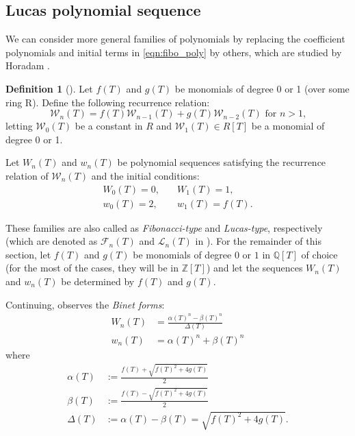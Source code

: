 \documentclass[letterpaper, 10pt]{article}
\newcommand{\bQ}{\mathbb{Q}}
\newcommand{\bZ}{\mathbb{Z}}
\newcommand{\1}{\mathds{1}}	%
\theoremstyle{definition}
\newtheorem{definition}[theorem]{Definition}
\theoremstyle{remark}
\begin{document}
\subsection{Lucas polynomial sequence} 
We can consider more general families of polynomials by replacing the coefficient polynomials and initial terms in \eqref{eqn:fibo_poly} by others, which are studied by Horadam \cite{Horadam1996}.

\begin{definition}[{\cite[Horadam]{Horadam1996}}]\label{lucassq}
    Let $f(T)$ and $g(T)$ be monomials of degree 0 or 1 (over some ring R).
    Define the following recurrence relation:
    \begin{equation}
       \mathcal{W}_n(T) = f(T) \mathcal{W}_{n - 1} (T) + g(T) \mathcal{W}_{n - 2}(T) \text{ for } n > 1 \text{,} \label{eqn:lucas_sequence}
    \end{equation}
    letting $\mathcal{W}_0(T)$ be a constant in $R$ and $\mathcal{W}_1(T) \in R[T]$ be a monomial of degree 0 or 1.
    
    Let $W_n(T)$ and $w_n(T)$ be polynomial sequences satisfying the recurrence relation of $\mathcal{W}_n(T)$ and the initial conditions:
    \begin{align*}
        W_0(T) = 0, &\quad W_1(T) = 1, \\
        w_0(T) = 2, &\quad w_1(T) = f(T) \text{.}
    \end{align*}
\end{definition}
These families are also called as \emph{Fibonacci-type} and \emph{Lucas-type}, respectively (which are denoted as $\mathcal{F}_n(T)$ and $\mathcal{L}_n(T)$ in \cite{florez2019resultant}). For the remainder of this section, let $f(T)$ and $g(T)$ be monomials of degree $0$ or $1$ in $\bQ[T]$ of choice (for the most of the cases, they will be in $\bZ[T]$) and let the sequences $W_n(T)$ and $w_n(T)$ be determined by $f(T)$ and $g(T)$.

Continuing, \cite{Horadam1996} observes the \emph{Binet forms}:
\begin{align}
    W_n(T) &= \frac{\alpha(T)^n - \beta(T)^n}{\Delta(T)} \label{eqn:Wnbinet} \\
    w_n(T) &= \alpha(T)^n + \beta(T)^n \label{eqn:wnbinet}
\end{align}
where
\begin{align}
    \alpha(T) &:= \frac{f(T) + \sqrt{f(T)^2 + 4 g(T)}}{2} \label{eqn:lucas_alpha} \\
    \beta(T) &:= \frac{f(T) - \sqrt{f(T)^2 + 4 g(T)}}{2} \label{eqn:lucas_beta} \\
    \Delta(T) &:= \alpha(T) - \beta(T) = \sqrt{f(T)^2 + 4 g(T)} \label{eqn:lucas_delta} \text{.}
\end{align}
\end{document}
